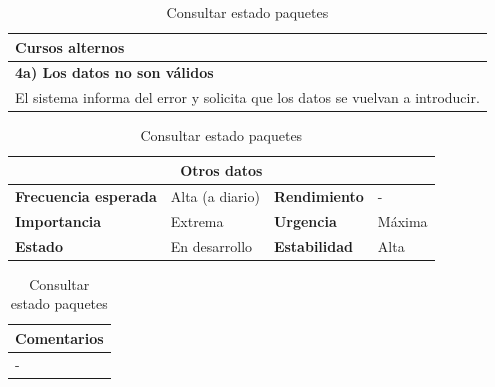 \documentclass[12pt,spanish]{article}
\begin{document}
\begin{table}[H]
\vspace{1cm}

\begin{tabular}{|m{10pt}|m{7.15cm}|m{10pt}|m{7.15cm}|}
\hline
\multicolumn{4}{|m{16.2cm}|}{\textbf{Cursos alternos}} \\
\hline
\multicolumn{4}{|m{16.2cm}|}{\textbf{4a) Los datos no son válidos}} \\
\hline
\multicolumn{4}{|m{16.2cm}|}{El sistema informa del error y solicita que los datos se vuelvan a introducir.} \\
\hline
\end{tabular}
\vspace{1cm}

\begin{tabular}{|m{3.72cm}|m{3.72cm}|m{3.72cm}|m{3.72cm}|}
\hline
\multicolumn{4}{|c|}{\textbf{Otros datos}} \\
\hline
\textbf{Frecuencia esperada} & Alta (a diario) & \textbf{Rendimiento} & - \\
\hline
\textbf{Importancia} & Extrema & \textbf{Urgencia} & Máxima \\
\hline
\textbf{Estado} & En desarrollo & \textbf{Estabilidad} & Alta \\
\hline
\end{tabular}

\vspace{1cm}

\begin{tabular}{|m{16.2cm}|}
\hline
\textbf{Comentarios} \\
\hline
- \\
\hline
\end{tabular}

\caption{Consultar estado paquetes}

\end{table}

\end{document}
